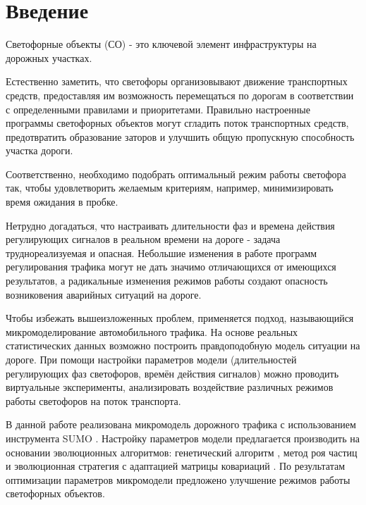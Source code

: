 \chapter*{Введение} %


Светофорные объекты (СО) - это ключевой элемент инфраструктуры на дорожных участках.

Естественно заметить, что светофоры организовывают движение транспортных средств, предоставляя им возможность перемещаться по дорогам в соответствии с определенными правилами и приоритетами. Правильно настроенные программы светофорных объектов могут сгладить поток транспортных средств, предотвратить образование заторов и улучшить общую пропускную способность участка дороги.

Соответственно, необходимо подобрать оптимальный режим работы светофора так, чтобы удовлетворить желаемым критериям, например, минимизировать время ожидания в пробке.

Нетрудно догадаться, что настраивать длительности фаз и времена действия регулирующих сигналов в реальном времени на дороге - задача труднореализуемая и опасная. Небольшие изменения в работе программ регулирования трафика могут не дать значимо отличающихся от имеющихся результатов, а радикальные изменения режимов работы создают опасность возниковения аварийных ситуаций на дороге.


Чтобы избежать вышеизложенных проблем, применяется подход, называющийся микромоделирование автомобильного трафика. На основе реальных статистических данных возможно построить правдоподобную модель ситуации на дороге. При помощи настройки параметров модели (длительностей регулирующих фаз светофоров, времён действия сигналов) можно проводить виртуальные эксперименты, анализировать воздействие различных режимов работы светофоров на поток транспорта.


В данной работе реализована микромодель дорожного трафика с использованием инструмента SUMO \cite{sumo-docs}. Настройку параметров модели предлагается производить на основании эволюционных алгоритмов: генетический алгоритм \cite{gad2023pygad}, метод роя частиц \cite{pyswarms2018doc} и эволюционная стратегия с адаптацией матрицы ковариаций \cite{HansenCmaes}. По результатам оптимизации параметров микромодели предложено улучшение режимов работы светофорных объектов.




